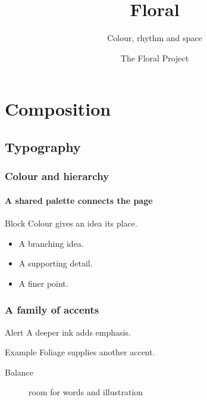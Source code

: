 \documentclass[aspectratio=169]{beamer}
\title{Floral}
\subtitle{Colour, rhythm and space}
\author{The Floral Project}
\institute{Procedural illustration and typography}
\date{}
\begin{document}
\begin{frame}
  \titlepage
\end{frame}

\section{Composition}
\subsection{Typography}

\begin{frame}
  \frametitle{Colour and hierarchy}
  \framesubtitle{A shared palette connects the page}
  \begin{block}{Block}
    Colour gives an idea its place.
  \end{block}
  \begin{itemize}
    \item A branching idea.
    \item A supporting detail.
    \item A finer point.
  \end{itemize}
\end{frame}

\begin{frame}
  \frametitle{A family of accents}
  \begin{alertblock}{Alert}
    A deeper ink adds \alert{emphasis}.
  \end{alertblock}
  \begin{exampleblock}{Example}
    Foliage supplies another accent.
  \end{exampleblock}
  \begin{description}
    \item[Balance] room for words and illustration
  \end{description}
\end{frame}
\end{document}
